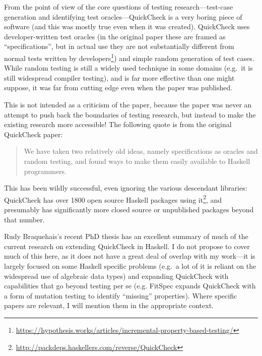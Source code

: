 From the point of view of the core questions of testing research---test-case generation and identifying test oracles---QuickCheck
is a very boring piece of software (and this was mostly true even when it was created).
QuickCheck uses developer-written test oracles (in the original paper these are framed as ``specifications'',
but in actual use they are not substantially different from normal tests written by developers\footnote{\url{https://hypothesis.works/articles/incremental-property-based-testing/}}) and simple random generation of test cases.
While random testing is still a widely used technique in some domains
(e.g.\ it is still widespread compiler testing),
and is far more effective than one might suppose\cite{DBLP:journals/tse/HamletT90, DBLP:journals/pacmpl/MajumdarN18},
it was far from cutting edge even when the paper was published.

This is not intended as a criticism of the paper,
because the paper was never an attempt to push back the boundaries of testing research,
but instead to make the existing research more accessible!
The following quote is from the original QuickCheck paper\cite{DBLP:conf/icfp/ClaessenH00}:

\begin{quote}
We have taken two relatively old ideas, namely specifications
as oracles and random testing, and found ways to make
them easily available to Haskell programmers.
\end{quote}

This has been wildly successful,
even ignoring the various descendant libraries:
QuickCheck has over 1800 open source Haskell packages using it\footnote{\url{http://packdeps.haskellers.com/reverse/QuickCheck}},
and presumably has significantly more closed source or unpublished packages beyond that number.

Rudy Braquehais's recent PhD thesis\cite{matela2017tools} has an excellent summary of much of the current research on extending QuickCheck in Haskell.
I do not propose to cover much of this here,
as it does not have a great deal of overlap with my work---it
is largely focused on some Haskell specific problems (e.g.\ a lot of it is reliant on the widespread use of algebraic data types) and expanding QuickCheck with capabilities that go beyond testing per se
(e.g. FitSpec\cite{DBLP:conf/haskell/BraquehaisR16} expands QuickCheck with a form of mutation testing\cite{DBLP:journals/tse/JiaH11} to identify ``missing'' properties).
Where specific papers are relevant,
I will mention them in the appropriate context.

